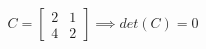 \documentclass[preview]{standalone}
\begin{document}
\begin{align*}
C = \begin{bmatrix} 2 & 1 \\ 4 & 2 \end{bmatrix} \implies det(C) = 0
\end{align*}
\end{document}
